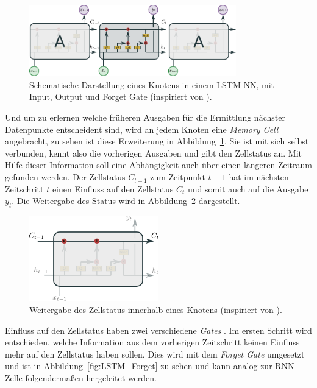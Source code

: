             \begin{figure}[ht]
                \centering
                \includegraphics[width=0.8\textwidth]{images/Illustrationen/LSTM}
                \caption{Schematische Darstellung eines Knotens in einem LSTM NN, mit Input, Output und Forget Gate (inspiriert von \cite{OLAH2015}).}
                \label{fig:LSTM}
            \end{figure}

            Und um zu erlernen welche früheren Ausgaben für die Ermittlung nächster Datenpunkte entscheident sind, wird an jedem Knoten eine \textit{Memory Cell}  angebracht, zu sehen ist diese Erweiterung in Abbildung~\ref{fig:LSTM}.
            Sie ist mit sich selbst verbunden, kennt also die vorherigen Ausgaben und gibt den Zellstatus an.
            Mit Hilfe dieser Information soll eine Abhängigkeit auch über einen längeren Zeitraum gefunden werden.
            Der Zellstatus $C_{t-1}$ zum Zeitpunkt $t-1$ hat im nächsten Zeitschritt $t$ einen Einfluss auf den Zellstatus $C_{t}$ und somit auch auf die Ausgabe $y_t$.
            Die Weitergabe des Status wird in Abbildung~\ref{fig:LSTM_Status} dargestellt.

                \begin{figure}[ht]
                    \centering
                    \includegraphics[width=0.5\textwidth]{images/Illustrationen/LSTM_MC}
                    \caption{Weitergabe des Zellstatus innerhalb eines Knotens (inspiriert von \cite{OLAH2015}).}
                    \label{fig:LSTM_Status}
                \end{figure}
                
                Einfluss auf den Zellstatus haben zwei verschiedene \textit{Gates} .
            Im ersten Schritt wird entschieden, welche Information aus dem vorherigen Zeitschritt keinen Einfluss mehr auf den Zellstatus haben sollen.
            Dies wird mit dem \textit{Forget Gate} umgesetzt und ist in Abbildung~\ref{fig:LSTM_Forget} zu sehen und kann analog zur RNN Zelle folgendermaßen hergeleitet werden.

